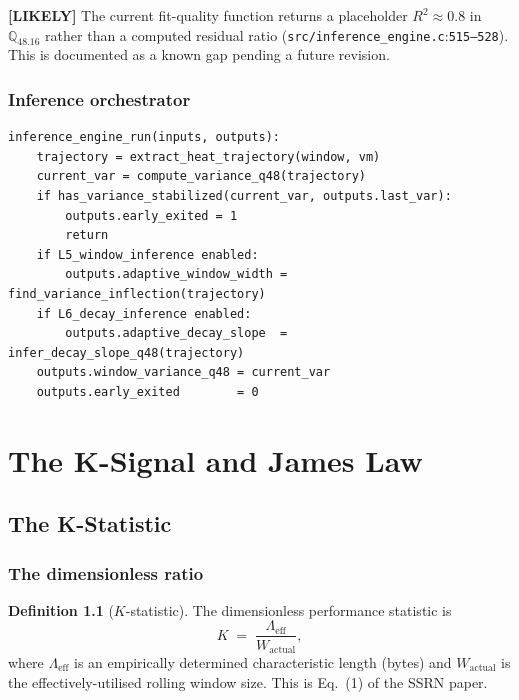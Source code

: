 \documentclass[11pt,letterpaper,openany]{book}
\theoremstyle{definition}
\newtheorem{definition}{Definition}[chapter]
\theoremstyle{plain}
\newcommand{\likely}{\textcolor{blue!60!black}{\textbf{[LIKELY]}}\xspace}
\newcommand{\Qfp}{\mathbb{Q}_{48.16}}                %
\newcommand{\Lambdaeff}{\Lambda_{\mathrm{eff}}}
\newcommand{\Wact}{W_{\mathrm{actual}}}
\newcommand{\sourceref}[2]{\texttt{#1}:\texttt{#2}}
\begin{document}
\likely The current fit-quality function returns a placeholder
$R^2 \approx 0.8$ in $\Qfp$ rather than a computed residual ratio
(\sourceref{src/inference\_engine.c}{515--528}). This is documented as a
known gap pending a future revision.

\section{Inference orchestrator}

\begin{algorithm}[H]
\caption{Inference engine main loop
  (\texttt{inference\_engine\_run()}, \texttt{src/inference\_engine.c}:537--614).}
\begin{lstlisting}[basicstyle=\ttfamily\footnotesize]
inference_engine_run(inputs, outputs):
    trajectory = extract_heat_trajectory(window, vm)
    current_var = compute_variance_q48(trajectory)
    if has_variance_stabilized(current_var, outputs.last_var):
        outputs.early_exited = 1
        return
    if L5_window_inference enabled:
        outputs.adaptive_window_width = find_variance_inflection(trajectory)
    if L6_decay_inference enabled:
        outputs.adaptive_decay_slope  = infer_decay_slope_q48(trajectory)
    outputs.window_variance_q48 = current_var
    outputs.early_exited        = 0
\end{lstlisting}
\end{algorithm}

\part{The K-Signal and James Law}

\chapter{The K-Statistic}
\label{ch:k-stat}

\section{The dimensionless ratio}

\begin{definition}[$K$-statistic]\label{def:k}
The dimensionless performance statistic is
\begin{equation}\label{eq:k}
  K \;=\; \frac{\Lambdaeff}{\Wact},
\end{equation}
where $\Lambdaeff$ is an empirically determined characteristic length
(bytes) and $\Wact$ is the effectively-utilised rolling window size.
This is Eq.~(1) of the SSRN paper.
\end{definition}
\end{document}
